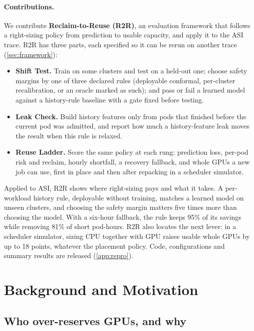 \documentclass[10pt]{article}
\begin{document}
\paragraph{Contributions.} We contribute \textbf{Reclaim-to-Reuse (R2R)}, an evaluation framework that follows a right-sizing policy from prediction to usable capacity, and apply it to the ASI trace. R2R has three parts, each specified so it can be rerun on another trace (\cref{sec:framework}):
\begin{itemize}
  \item \textbf{Shift Test.} Train on some clusters and test on a held-out one; choose safety margins by one of three declared rules (deployable conformal, per-cluster recalibration, or an oracle marked as such); and pass or fail a learned model against a history-rule baseline with a gate fixed before testing.
  \item \textbf{Leak Check.} Build history features only from pods that finished before the current pod was admitted, and report how much a history-feature leak moves the result when this rule is relaxed.
  \item \textbf{Reuse Ladder.} Score the same policy at each rung: prediction loss, per-pod risk and reclaim, hourly shortfall, a recovery fallback, and whole GPUs a new job can use, first in place and then after repacking in a scheduler simulator.
\end{itemize}
Applied to ASI, R2R shows where right-sizing pays and what it takes. A per-workload history rule, deployable without training, matches a learned model on unseen clusters, and choosing the safety margin matters five times more than choosing the model. With a six-hour fallback, the rule keeps 95\% of its savings while removing 81\% of short pod-hours. R2R also locates the next lever: in a scheduler simulator, sizing CPU together with GPU raises usable whole GPUs by up to 18 points, whatever the placement policy. Code, configurations and summary results are released (\cref{app:repro}).

\section{Background and Motivation}
\label{sec:background}

\subsection{Who over-reserves GPUs, and why}
\label{sec:bg-overres}
\end{document}
